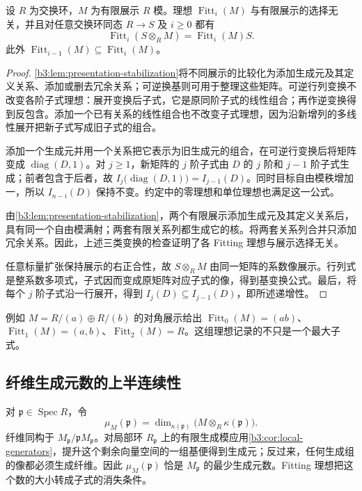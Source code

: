 \begin{theorem}\label{b3:thm:fitting-invariance-base-change}
	设 \(R\) 为交换环，\(M\) 为有限展示 \(R\) 模。理想 \(\operatorname{Fitt}_i(M)\) 与有限展示的选择无关，并且对任意交换环同态 \(R\to S\) 及 \(i\ge0\) 都有
	\[
		\operatorname{Fitt}_i(S\otimes_RM)=\operatorname{Fitt}_i(M)S.
	\]
	此外 \(\operatorname{Fitt}_{i-1}(M)\subseteq\operatorname{Fitt}_i(M)\)。
\end{theorem}
\begin{proof}
	\cref{b3:lem:presentation-stabilization}将不同展示的比较化为添加生成元及其定义关系、添加或删去冗余关系；可逆换基则可用于整理这些矩阵。可逆行列变换不改变各阶子式理想：展开变换后子式，它是原同阶子式的线性组合；再作逆变换得到反包含。添加一个已有关系的线性组合也不改变子式理想，因为沿新增列的多线性展开把新子式写成旧子式的组合。

	添加一个生成元并用一个关系把它表示为旧生成元的组合，在可逆行变换后将矩阵变成 \(\operatorname{diag}(D,1)\)。对 \(j\ge1\)，新矩阵的 \(j\) 阶子式由 \(D\) 的 \(j\) 阶和 \(j-1\) 阶子式生成；前者包含于后者，故 \(I_j\bigl(\operatorname{diag}(D,1)\bigr)=I_{j-1}(D)\)。同时目标自由模秩增加一，所以 \(I_{n-i}(D)\) 保持不变。约定中的零理想和单位理想也满足这一公式。

	由\cref{b3:lem:presentation-stabilization}，两个有限展示添加生成元及其定义关系后，具有同一个自由模满射；两套有限关系列都生成它的核。将两套关系列合并只添加冗余关系。因此，上述三类变换的检查证明了各 Fitting 理想与展示选择无关。

	任意标量扩张保持展示的右正合性，故 \(S\otimes_RM\) 由同一矩阵的系数像展示。行列式是整系数多项式，子式因而变成原矩阵对应子式的像，得到基变换公式。最后，将每个 \(j\) 阶子式沿一行展开，得到 \(I_j(D)\subseteq I_{j-1}(D)\)，即所述递增性。
\end{proof}

例如 \(M=R/(a)\oplus R/(b)\) 的对角展示给出 \(\operatorname{Fitt}_0(M)=(ab)\)、\(\operatorname{Fitt}_1(M)=(a,b)\)、\(\operatorname{Fitt}_2(M)=R\)。这组理想记录的不只是一个最大子式。

\subsection{纤维生成元数的上半连续性}
\label{b3:subsec:1203:02}

对 \(\mathfrak p\in\operatorname{Spec}R\)，令
\[
	\mu_M(\mathfrak p)=\dim_{\kappa(\mathfrak p)} \bigl(M\otimes_R\kappa(\mathfrak p)\bigr).
\]
纤维同构于 \(M_{\mathfrak p}/\mathfrak pM_{\mathfrak p}\)。对局部环 \(R_{\mathfrak p}\) 上的有限生成模应用\cref{b3:cor:local-generators}，提升这个剩余向量空间的一组基便得到生成元；反过来，任何生成组的像都必须生成纤维。因此 \(\mu_M(\mathfrak p)\) 恰是 \(M_{\mathfrak p}\) 的最少生成元数。Fitting 理想把这个数的大小转成子式的消失条件。

